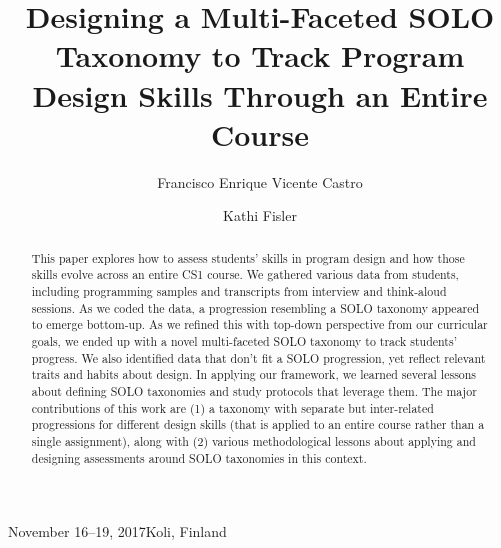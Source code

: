\documentclass[sigconf]{acmart}
\begin{document}
\title{Designing a Multi-Faceted SOLO Taxonomy to Track Program Design Skills Through an Entire Course}


\author{Francisco Enrique Vicente Castro}

\author{Kathi Fisler}


\renewcommand{\shortauthors}{Castro and Fisler}


\begin{abstract}

  This paper explores how to assess students' skills in program design and how those skills evolve across an entire CS1 course.  We gathered
  various data from students, including programming samples and
  transcripts from interview and think-aloud sessions. As we coded the
  data, a progression resembling a SOLO taxonomy appeared to emerge
  bottom-up.  As we refined this with top-down perspective from our
  curricular goals, we ended up with a novel multi-faceted SOLO
  taxonomy to track students' progress. We also identified data that
  don't fit a SOLO progression, yet reflect relevant traits and habits
  about design.  In applying our framework, we learned several lessons
  about defining SOLO taxonomies and study protocols that leverage
  them.  The major contributions of this work are (1) a taxonomy
  with separate but inter-related progressions for different design
  skills (that is applied to an entire course rather than a single
  assignment), along with (2) various methodological lessons about
  applying and designing assessments around SOLO taxonomies in this context.

\end{abstract}

{November 16--19, 2017}{Koli, Finland}

\fancyhead{}
\end{document}
